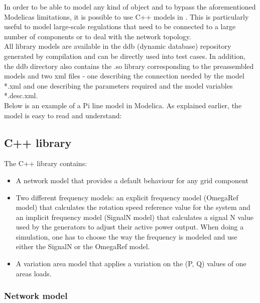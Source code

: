 \documentclass[a4paper, 12pt]{report}
\begin{document}
In order to be able to model any kind of object and to bypass the aforementioned Modelica\textquotesingle s limitations, it is possible to use C++ models in \Dynawo. This is particularly useful to model large-scale regulations that need to be connected to a large number of components or to deal with the network topology. \\

All library models are available in the ddb (dynamic database) repository generated by \Dynawo compilation and can be directly used into test cases. In addition, the ddb directory also contains the .so library corresponding to the preassembled models and two xml files - one describing the connection needed by the model *.xml and one describing the parameters required and the model variables *.desc.xml.  \\

Below is an example of a Pi line model in Modelica. As explained earlier, the model is easy to read and understand:



\subsection{C++ library}

The C++ library contains:
\begin{itemize}
\item A network model that provides a default behaviour for any grid component
\item Two different frequency models: an explicit  frequency model (OmegaRef model) that calculates the rotation speed reference value for the system and an implicit frequency model (SignalN model) that calculates a signal N value used by the generators to adjust their active power output. When doing a simulation, one has to choose the way the frequency is modeled and use either the SignalN or the OmegaRef model.
\item A variation area model that applies a variation on the (P, Q) values of one area\textquotesingle s loads.
\end{itemize}

\subsubsection{Network model}
\end{document}
